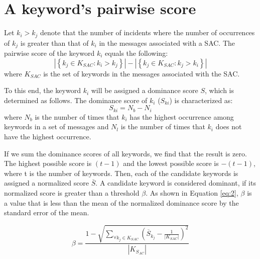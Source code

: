 \section{A keyword’s pairwise score}

Let $ k_{i}>k_{j} $ denote that the number of incidents where the number of occurrences of $ k_{ j} $ is greater than that of $ k_{ i} $ in the messages associated with a SAC. The pairwise score of the keyword $ k_{ i} $ equals the following:
\begin{equation*}
	\left|\left\{k_{j} \in K_{S A C}: k_{i}>k_{j}\right\}\right|-\left|\left\{k_{j} \in K_{S A C}: k_{j}>k_{i}\right\}\right|
\end{equation*}
where $ K_{ SAC} $ is the set of keywords in the messages associated with the SAC.	

To this end, the keyword $ k_{ i} $ will be assigned a dominance score
$ S $, which is determined as follows. The dominance score of $ k_{ i} $
($ S_{ki} $) is characterized as:
\begin{equation}\label{eq:1}
S_{ki}=N_{b}-N_{i}
\end{equation}
where $ N_{ b} $ is the number of times that $ k_{ i} $ has the highest occurrence among keywords in a set of messages and $ N_{ l} $ is the number of times that $ k_{ i} $ does not have the highest occurrence. 

If we sum the dominance scores of all keywords, we find that the result is zero. The highest possible score is $ ( t - 1) $ and the lowest possible score is $ -( t - 1) $, where t is the number of keywords. Then, each of the candidate keywords is assigned a normalized score $ \bar{S} $. A candidate keyword is considered dominant, if its normalized score is greater than a threshold $ \beta $. As shown in Equation \eqref{eq:2}, $ \beta $ is a value that is less than the mean of the normalized dominance score by the standard error of the mean.

\begin{equation}\label{eq:2}
\beta=\frac{1-\sqrt{\sum_{\forall k_{j} \in K_{S A C}}\left(\overline{S}_{k_{j}}-\frac{1}{\left|K_{S A C}\right|}\right)^{2}}}{\left|K_{S_{A C}}\right|}
\end{equation}